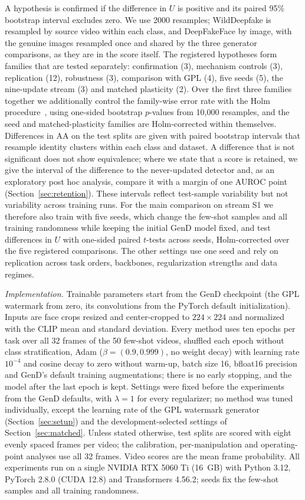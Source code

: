 \documentclass{ieeeaccess}
\begin{document}
A hypothesis is confirmed if the difference in $U$ is positive and its paired 95\% bootstrap interval excludes zero. We use 2000 resamples; WildDeepfake is resampled by source video within each class, and DeepFakeFace by image, with the genuine images resampled once and shared by the three generator comparisons, as they are in the score itself. The registered hypotheses form families that are tested separately: confirmation (3), mechanism controls (3), replication (12), robustness (3), comparison with GPL (4), five seeds (5), the nine-update stream (3) and matched plasticity (2). Over the first three families together we additionally control the family-wise error rate with the Holm procedure~\cite{holm1979}, using one-sided bootstrap $p$-values from 10{,}000 resamples, and the seed and matched-plasticity families are Holm-corrected within themselves. Differences in AA on the test splits are given with paired bootstrap intervals that resample identity clusters within each class and dataset. A difference that is not significant does not show equivalence; where we state that a score is retained, we give the interval of the difference to the never-updated detector and, as an exploratory post hoc analysis, compare it with a margin of one AUROC point (Section~\ref{sec:retention}). These intervals reflect test-sample variability but not variability across training runs. For the main comparison on stream S1 we therefore also train with five seeds, which change the few-shot samples and all training randomness while keeping the initial GenD model fixed, and test differences in $U$ with one-sided paired $t$-tests across seeds, Holm-corrected over the five registered comparisons. The other settings use one seed and rely on replication across task orders, backbones, regularization strengths and data regimes.

\textit{Implementation.} Trainable parameters start from the GenD checkpoint (the GPL watermark from zero, its convolutions from the PyTorch default initialization). Inputs are face crops resized and center-cropped to $224\times224$ and normalized with the CLIP mean and standard deviation. Every method uses ten epochs per task over all 32 frames of the 50 few-shot videos, shuffled each epoch without class stratification, Adam ($\beta=(0.9,0.999)$, no weight decay) with learning rate $10^{-4}$ and cosine decay to zero without warm-up, batch size 16, bfloat16 precision and GenD's default training augmentations; there is no early stopping, and the model after the last epoch is kept. Settings were fixed before the experiments from the GenD defaults, with $\lambda=1$ for every regularizer; no method was tuned individually, except the learning rate of the GPL watermark generator (Section~\ref{sec:setup}) and the development-selected settings of Section~\ref{sec:matched}. Unless stated otherwise, test splits are scored with eight evenly spaced frames per video; the calibration, per-manipulation and operating-point analyses use all 32 frames. Video scores are the mean frame probability. All experiments run on a single NVIDIA RTX 5060 Ti (16~GB) with Python 3.12, PyTorch 2.8.0 (CUDA 12.8) and Transformers 4.56.2; seeds fix the few-shot samples and all training randomness.
\end{document}
